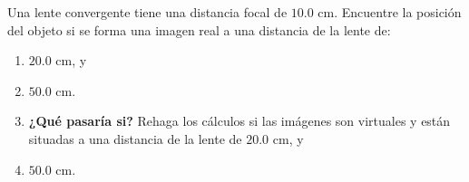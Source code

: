 \item Una lente convergente tiene una distancia focal de $10.0\text{ cm}$. Encuentre la posición del objeto si se forma una imagen real a una distancia de la lente de:
\begin{enumerate}
    \item $20.0\text{ cm}$, y
    \item $50.0\text{ cm}$.
    \item \textbf{¿Qué pasaría si?} Rehaga los cálculos si las imágenes son virtuales y están situadas a una distancia de la lente de $20.0\text{ cm}$, y
    \item $50.0\text{ cm}$.
\end{enumerate}